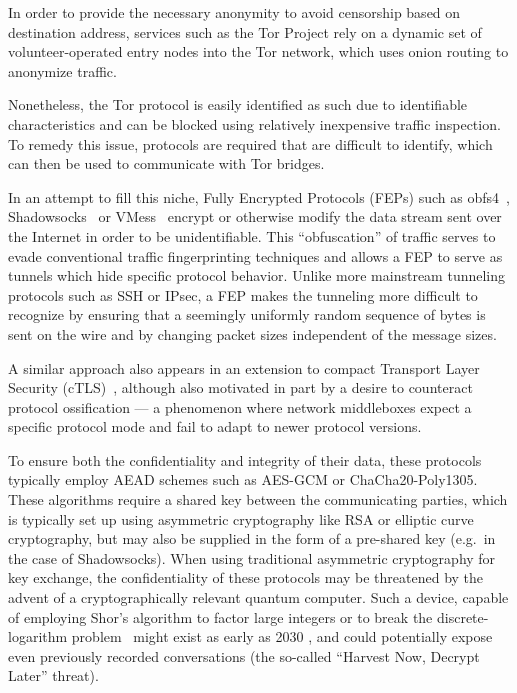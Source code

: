 In order to provide the necessary anonymity to avoid censorship based on destination address, services such as the Tor Project \cite{torproject} rely on a dynamic set of volunteer-operated entry nodes into the Tor network, which uses onion routing to anonymize traffic.

Nonetheless, the Tor protocol is easily identified as such due to identifiable characteristics and can be blocked using relatively inexpensive traffic inspection. To remedy this issue, protocols are required that are difficult to identify, which can then be used to communicate with Tor bridges.

In an attempt to fill this niche, Fully Encrypted Protocols (FEPs) such as obfs4~\cite{obfs4}, Shadowsocks~\cite{shadowsocks} or VMess~\cite{vmess} encrypt or otherwise modify the data stream sent over the Internet in order to be unidentifiable. This ``obfuscation'' of traffic serves to evade conventional traffic fingerprinting techniques and allows a FEP to serve as tunnels which hide specific protocol behavior.
Unlike more mainstream tunneling protocols such as SSH or IPsec, a FEP makes the tunneling more difficult to recognize by ensuring that a seemingly uniformly random sequence of bytes is sent on the wire and by changing packet sizes independent of the message sizes.

A similar approach also appears in an extension to compact Transport Layer Security (cTLS)~\cite{cpbs-pseudorandom-ctls-01}, although also motivated in part by a desire to counteract protocol ossification --- a phenomenon where network middleboxes expect a specific protocol mode and fail to adapt to newer protocol versions.

To ensure both the confidentiality and integrity of their data, these protocols typically employ AEAD schemes such as AES-GCM or ChaCha20-Poly1305. These algorithms require a shared key between the communicating parties, which is typically set up using asymmetric cryptography like RSA or elliptic curve cryptography, but may also be supplied in the form of a pre-shared key (e.g.~in the case of Shadowsocks).
When using traditional asymmetric cryptography for key exchange, the confidentiality of these protocols may be threatened by the advent of a cryptographically relevant quantum computer.
Such a device, capable of employing Shor's algorithm to factor large integers or to break the discrete-logarithm problem~\cite{crqc-nccoe} might exist as early as 2030 \cite{quantum-threat-joint,quantum-threat-bsi,quantum-threat-anssi,quantum-threat-enisa,quantum-threat-nist}, and could potentially expose even previously recorded conversations (the so-called ``Harvest Now, Decrypt Later'' threat).

